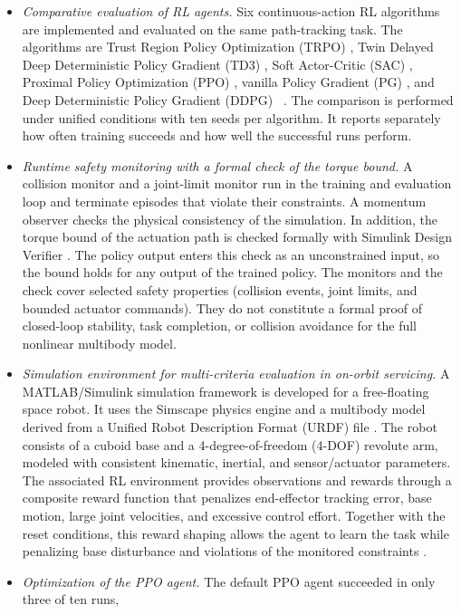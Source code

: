 \documentclass{ieeeaccess}
\begin{document}
\begin{itemize}
  \item \textit{Comparative evaluation of RL agents.} Six continuous-action RL algorithms are implemented
  and evaluated on the same path-tracking task. The algorithms are Trust Region Policy Optimization
  (TRPO) \cite{b14}, Twin Delayed Deep Deterministic Policy Gradient (TD3) \cite{b17}, Soft Actor-Critic
  (SAC) \cite{b18}, Proximal Policy Optimization (PPO) \cite{b15}, vanilla Policy Gradient (PG)
  \cite{b21}, and Deep Deterministic Policy Gradient (DDPG) ~\cite{b16}. The
  comparison is performed under unified conditions with ten seeds per algorithm. It reports separately how
  often training succeeds and how well the successful runs perform.
  \item \textit{Runtime safety monitoring with a formal check of the torque bound.} A collision monitor
  and a joint-limit monitor run in the training and evaluation loop and terminate episodes that violate
  their constraints. A momentum observer checks the physical consistency of the simulation. In addition,
  the torque bound of the actuation path is checked formally with Simulink Design Verifier \cite{b5}. The
  policy output enters this check as an unconstrained input, so the bound holds for any output of the
  trained policy. The monitors and the check cover selected safety properties (collision events, joint
  limits, and bounded actuator commands). They do not constitute a formal proof of closed-loop stability,
  task completion, or collision avoidance for the full nonlinear multibody model.
 \item \textit{Simulation environment for multi-criteria evaluation in on-orbit servicing.} A
 MATLAB/Simulink simulation framework is developed for a free-floating space robot. It uses the Simscape
 physics engine and a multibody model derived from a Unified Robot Description Format (URDF) file
 \cite{b25,b26,b27}. The robot consists of a cuboid base and a 4-degree-of-freedom (4-DOF) revolute arm,
 modeled with consistent kinematic, inertial, and sensor/actuator parameters. The associated RL
 environment provides observations and rewards through a composite reward function that penalizes
 end-effector tracking error, base motion, large joint velocities, and excessive control effort. Together
 with the reset conditions, this reward shaping allows the agent to learn the task while penalizing base
 disturbance and violations of the monitored constraints \cite{b7}.
 \item \textit{Optimization of the PPO agent.} The default PPO agent succeeded in only three of ten runs,

\end{itemize}
\end{document}
